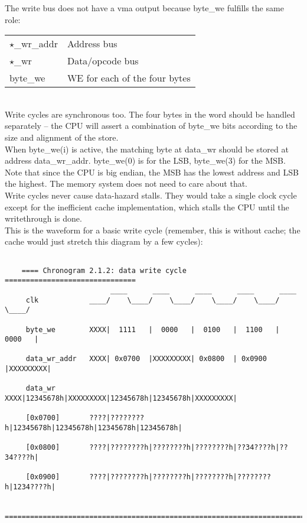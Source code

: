 \documentclass[11pt]{article}
\begin{document}
    The write bus does not have a vma output because byte\_we fulfills the same
    role:\\
   
\begin{tabular}{ l l }
    $\star$\_wr\_addr   & Address bus\\
    $\star$\_wr         & Data/opcode bus\\
    byte\_we            & WE for each of the four bytes
\end{tabular}\\

    Write cycles are synchronous too. The four bytes in the word should be
    handled separately -- the CPU will assert a combination of byte\_we bits
    according to the size and alignment of the store.\\

    When byte\_we(i) is active, the matching byte at data\_wr should be stored
    at address data\_wr\_addr. byte\_we(0) is for the LSB, byte\_we(3) for the MSB.
    Note that since the CPU is big endian, the MSB has the lowest address and
    LSB the highest. The memory system does not need to care about that.\\

    Write cycles never cause data-hazard stalls. They would take a single
    clock cycle except for the inefficient cache implementation, which
    stalls the CPU until the writethrough is done.\\

    This is the waveform for a basic write cycle (remember, this is without
    cache; the cache would just stretch this diagram by a few cycles):

\begin{verbatim}

    ==== Chronogram 2.1.2: data write cycle ===============================
                         ____      ____      ____      ____      ____
     clk            ____/    \____/    \____/    \____/    \____/    \____/

     byte_we        XXXX|  1111   |  0000   |  0100   |  1100   |  0000   |

     data_wr_addr   XXXX| 0x0700  |XXXXXXXXX| 0x0800  | 0x0900  |XXXXXXXXX|

     data_wr        XXXX|12345678h|XXXXXXXXX|12345678h|12345678h|XXXXXXXXX|

     [0x0700]       ????|????????h|12345678h|12345678h|12345678h|12345678h|

     [0x0800]       ????|????????h|????????h|????????h|??34????h|??34????h|

     [0x0900]       ????|????????h|????????h|????????h|????????h|1234????h|

    ========================================================================
\end{verbatim}\\
\end{document}
